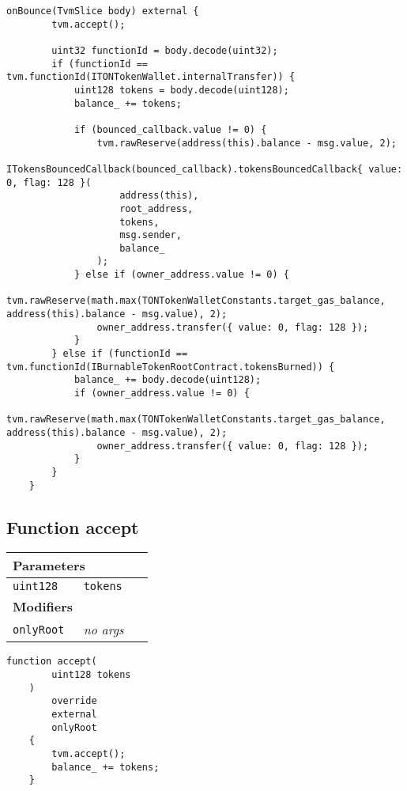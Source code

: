 \begin{lstlisting}[firstnumber=653]
    onBounce(TvmSlice body) external {
        tvm.accept();

        uint32 functionId = body.decode(uint32);
        if (functionId == tvm.functionId(ITONTokenWallet.internalTransfer)) {
            uint128 tokens = body.decode(uint128);
            balance_ += tokens;

            if (bounced_callback.value != 0) {
                tvm.rawReserve(address(this).balance - msg.value, 2);
                ITokensBouncedCallback(bounced_callback).tokensBouncedCallback{ value: 0, flag: 128 }(
                    address(this),
                    root_address,
                    tokens,
                    msg.sender,
                    balance_
                );
            } else if (owner_address.value != 0) {
                tvm.rawReserve(math.max(TONTokenWalletConstants.target_gas_balance, address(this).balance - msg.value), 2);
                owner_address.transfer({ value: 0, flag: 128 });
            }
        } else if (functionId == tvm.functionId(IBurnableTokenRootContract.tokensBurned)) {
            balance_ += body.decode(uint128);
            if (owner_address.value != 0) {
                tvm.rawReserve(math.max(TONTokenWalletConstants.target_gas_balance, address(this).balance - msg.value), 2);
                owner_address.transfer({ value: 0, flag: 128 });
            }
        }
    }
\end{lstlisting}

\subsection{Function accept}


\ifsoltables
\noindent\begin{tabular}{|l|l|p{5cm}|}\hline
\multicolumn{3}{|l|}{\bf Parameters}\\\hline
\tt uint128 & \tt tokens &\\\hline
\multicolumn{3}{|l|}{\bf Modifiers}\\\hline
\tt onlyRoot & {\em no args} &\\\hline
\end{tabular}
\fi

\vspace{2cm}

\begin{lstlisting}[firstnumber=96]
    function accept(
        uint128 tokens
    )
        override
        external
        onlyRoot
    {
        tvm.accept();
        balance_ += tokens;
    }
\end{lstlisting}

